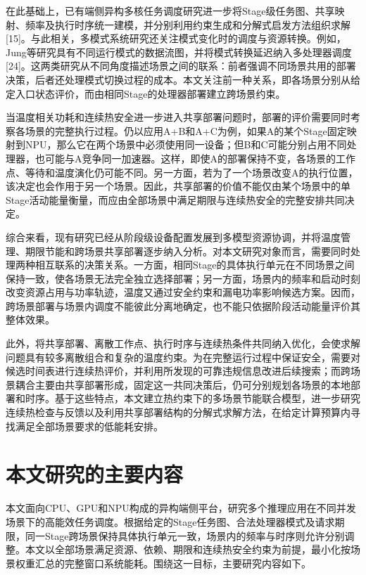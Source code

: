 在此基础上，已有端侧异构多核任务调度研究进一步将Stage级任务图、共享映射、频率及执行时序统一建模，并分别利用约束生成和分解式启发方法组织求解{[}15{]}。与此相关，多模式系统研究还关注模式变化时的调度与资源转换。例如，Jung等研究具有不同运行模式的数据流图，并将模式转换延迟纳入多处理器调度{[}24{]}。这两类研究从不同角度描述场景之间的联系：前者强调不同场景共用的部署决策，后者还处理模式切换过程的成本。本文关注前一种关系，即各场景分别从给定入口状态评价，而由相同Stage的处理器部署建立跨场景约束。

当温度相关功耗和连续热安全进一步进入共享部署问题时，部署的评价需要同时考察各场景的完整执行过程。仍以应用A+B和A+C为例，如果A的某个Stage固定映射到NPU，那么它在两个场景中必须使用同一设备；但B和C可能分别占用不同处理器，也可能与A竞争同一加速器。这样，即使A的部署保持不变，各场景的工作点、等待和温度演化仍可能不同。另一方面，若为了一个场景改变A的执行位置，该决定也会作用于另一个场景。因此，共享部署的价值不能仅由某个场景中的单Stage活动能量衡量，而应由全部场景中满足期限与连续热安全的完整安排共同决定。

综合来看，现有研究已经从阶段级设备配置发展到多模型资源协调，并将温度管理、期限节能和跨场景共享部署逐步纳入分析。对本文研究对象而言，需要同时处理两种相互联系的决策关系。一方面，相同Stage的具体执行单元在不同场景之间保持一致，使各场景无法完全独立选择部署；另一方面，场景内的频率和启动时刻改变资源占用与功率轨迹，温度又通过安全约束和漏电功率影响候选方案。因而，跨场景部署与场景内调度不能彼此分离地确定，也不能只依据阶段活动能量评价其整体效果。

此外，将共享部署、离散工作点、执行时序与连续热条件共同纳入优化，会使求解问题具有较多离散组合和复杂的温度约束。为在完整运行过程中保证安全，需要对候选时间表进行连续热评价，并利用所发现的可靠违规信息改进后续搜索；而跨场景耦合主要由共享部署形成，固定这一共同决策后，仍可分别规划各场景的本地部署和时序。基于这些特点，本文建立热约束下的多场景节能联合模型，进一步研究连续热检查与反馈以及利用共享部署结构的分解式求解方法，在给定计算预算内寻找满足全部场景要求的低能耗安排。

\section{本文研究的主要内容}\label{ux672cux6587ux7814ux7a76ux7684ux4e3bux8981ux5185ux5bb9}

本文面向CPU、GPU和NPU构成的异构端侧平台，研究多个推理应用在不同并发场景下的高能效任务调度。根据给定的Stage任务图、合法处理器模式及请求期限，同一Stage跨场景保持具体执行单元一致，场景内的频率与时序则允许分别调整。本文以全部场景满足资源、依赖、期限和连续热安全约束为前提，最小化按场景权重汇总的完整窗口系统能耗。围绕这一目标，主要研究内容如下。

